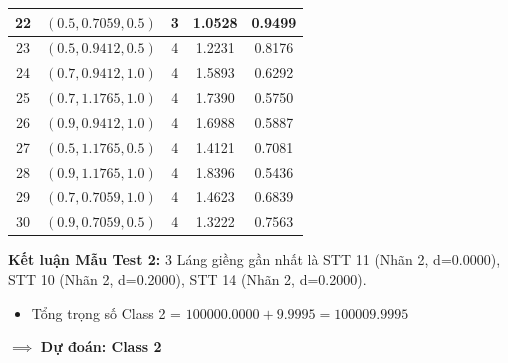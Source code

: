 \documentclass[12pt,a4paper]{article}
\begin{document}
\begin{table}[H]
\begin{tabular}{|c|c|c|c|c|}
22 & $(0.5, 0.7059, 0.5)$ & 3 & 1.0528 & 0.9499 \\ \hline
23 & $(0.5, 0.9412, 0.5)$ & 4 & 1.2231 & 0.8176 \\ \hline
24 & $(0.7, 0.9412, 1.0)$ & 4 & 1.5893 & 0.6292 \\ \hline
25 & $(0.7, 1.1765, 1.0)$ & 4 & 1.7390 & 0.5750 \\ \hline
26 & $(0.9, 0.9412, 1.0)$ & 4 & 1.6988 & 0.5887 \\ \hline
27 & $(0.5, 1.1765, 0.5)$ & 4 & 1.4121 & 0.7081 \\ \hline
28 & $(0.9, 1.1765, 1.0)$ & 4 & 1.8396 & 0.5436 \\ \hline
29 & $(0.7, 0.7059, 1.0)$ & 4 & 1.4623 & 0.6839 \\ \hline
30 & $(0.9, 0.7059, 0.5)$ & 4 & 1.3222 & 0.7563 \\ \hline
\end{tabular}
\end{table}

\textbf{Kết luận Mẫu Test 2:} 3 Láng giềng gần nhất là STT 11 (Nhãn 2, d=0.0000), STT 10 (Nhãn 2, d=0.2000), STT 14 (Nhãn 2, d=0.2000).
\begin{itemize}
    \item Tổng trọng số Class 2 = $100000.0000 + 9.9995 = 100009.9995$
\end{itemize}
$\implies$ \textbf{Dự đoán: Class 2}
\end{document}
